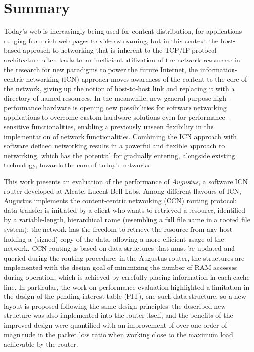 \documentclass[11pt,a4paper,twoside,titlepage,openany]{book}
\begin{document}

\chapter*{Summary}

Today's web is increasingly being used for content distribution, for applications ranging from rich web pages to video streaming, but in this context the host-based approach to networking that is inherent to the TCP/IP protocol architecture often leads to an inefficient utilization of the network resources: in the research for new paradigms to power the future Internet, the information-centric networking (ICN) approach moves awareness of the content to the core of the network, giving up the notion of host-to-host link and replacing it with a directory of named resources.
In the meanwhile, new general purpose high-performance hardware is opening new possibilities for software networking applications to overcome custom hardware solutions even for performance-sensitive functionalities, enabling a previously unseen flexibility in the implementation of network functionalities.
Combining the ICN approach with software defined networking results in a powerful and flexible approach to networking, which has the potential for gradually entering, alongside existing technology, towards the core of today's networks.

This work presents an evaluation of the performance of \emph{Augustus}, a software ICN router developed at Alcatel-Lucent Bell Labs. Among different flavours of ICN, Augustus implements the content-centric networking (CCN) routing protocol: data transfer is initiated by a client who wants to retrieved a resource, identified by a variable-length, hierarchical name (resembling a full file name in a rooted file system): the network has the freedom to retrieve the resource from any host holding a (signed) copy of the data, allowing a more efficient usage of the network. %
CCN routing is based on data structures that must be updated and queried during the routing procedure: in the Augustus router, the structures are implemented with the design goal of minimizing the number of RAM accesses during operation, which is achieved by carefully placing information in each cache line. In particular, the work on performance evaluation highlighted a limitation in the design of the pending interest table (PIT), one such data structure, so a new layout is proposed following the same design principles: the described new structure was also implemented into the router itself, and the benefits of the improved design were quantified with an improvement of over one order of magnitude in the packet loss ratio when working close to the maximum load achievable by the router.
\end{document}
